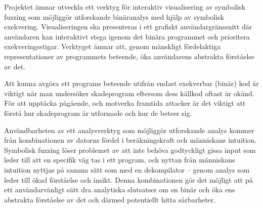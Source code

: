 
Projektet ämnar utveckla ett verktyg för interaktiv visualisering av symbolisk
fuzzing som möjliggör utforskande binäranalys med hjälp av symbolisk
exekvering. Visualiseringen ska presenteras i ett grafiskt användargränssnitt
där användaren kan interaktivt stega igenom det binära programmet och
prioritera exekveringsstigar. Verktyget ämnar att, genom mänskligt fördelaktiga
representationer av programmets beteende, öka användarens abstrakta förståelse
av det.

Att kunna avgöra ett programs beteende utifrån endast exekverbar (binär) 
kod är viktigt när man undersöker skadeprogram eftersom dess källkod oftast är
okänd. För att upptäcka pågående, och motverka framtida attacker är det viktigt
att förstå hur skadeprogram är utformade och hur de beteer sig. 

Användbarheten av ett analysverktyg som möjliggör utforskande analys kommer
från kombinationen av datorns fördel i beräkningskraft och människans
intuition. Symbolisk fuzzing löser problemet av att inte behöva godtyckligt
gissa input som leder till att en specifik väg tas i ett program,
och nyttan från människans intuition nyttjas på samma sätt som med en
dekompilator -- genom analys som leder till ökad förståelse och insikt. Denna
kombinationen gör det möjligt att på ett användarvänligt sätt dra analytiska
slutsatser om en binär och öka ens abstrakta förståelse av det och därmed
potentiellt hitta sårbarheter.

